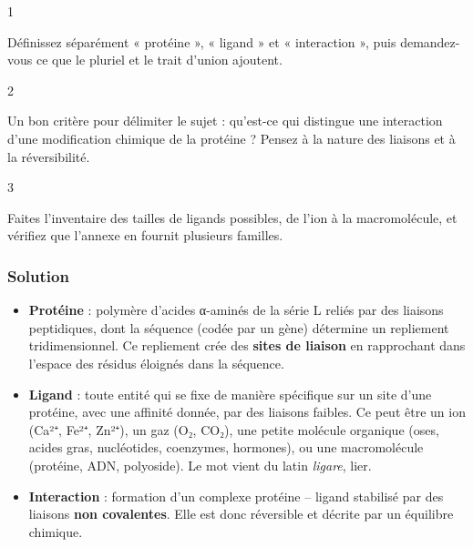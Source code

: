 \documentclass[11pt,a4paper]{article}
\providecommand{\tightlist}{\setlength{\itemsep}{0pt}\setlength{\parskip}{0pt}}
\begin{document}
\begin{indication}{1}

Définissez séparément « protéine », « ligand » et « interaction », puis demandez-vous ce que le pluriel et le trait d'union ajoutent.

\end{indication}

\begin{indication}{2}

Un bon critère pour délimiter le sujet : qu'est-ce qui distingue une interaction d'une modification chimique de la protéine ? Pensez à la nature des liaisons et à la réversibilité.

\end{indication}

\begin{indication}{3}

Faites l'inventaire des tailles de ligands possibles, de l'ion à la macromolécule, et vérifiez que l'annexe en fournit plusieurs familles.

\end{indication}

\hypertarget{solution}{%
\subsubsection{Solution}\label{solution}}

\begin{itemize}
\tightlist
\item
  \textbf{Protéine} : polymère d'acides α-aminés de la série L reliés par des liaisons peptidiques, dont la séquence (codée par un gène) détermine un repliement tridimensionnel. Ce repliement crée des \textbf{sites de liaison} en rapprochant dans l'espace des résidus éloignés dans la séquence.
\item
  \textbf{Ligand} : toute entité qui se fixe de manière spécifique sur un site d'une protéine, avec une affinité donnée, par des liaisons faibles. Ce peut être un ion (Ca²⁺, Fe²⁺, Zn²⁺), un gaz (O₂, CO₂), une petite molécule organique (oses, acides gras, nucléotides, coenzymes, hormones), ou une macromolécule (protéine, ADN, polyoside). Le mot vient du latin \emph{ligare}, lier.
\item
  \textbf{Interaction} : formation d'un complexe protéine -- ligand stabilisé par des liaisons \textbf{non covalentes}. Elle est donc réversible et décrite par un équilibre chimique.
\end{itemize}
\end{document}
